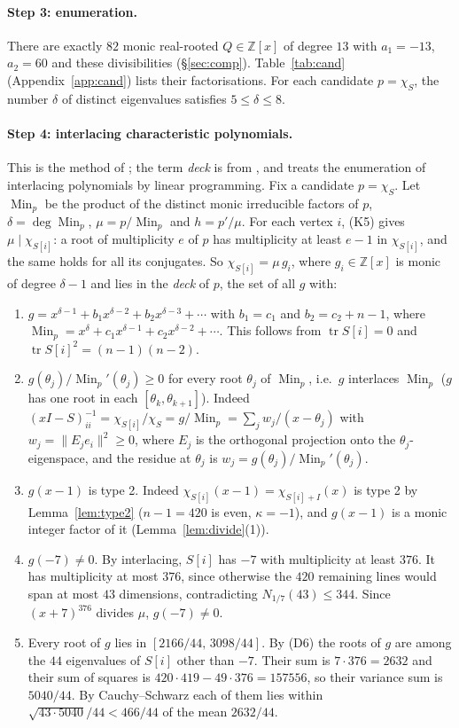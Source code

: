 \documentclass[11pt]{article}
\theoremstyle{definition}
\newcommand{\Z}{\mathbb{Z}}
\newcommand{\tr}{\operatorname{tr}}
\newcommand{\Min}{\operatorname{Min}}
\begin{document}
\paragraph{Step 3: enumeration.} There are exactly $82$ monic real-rooted $Q\in\Z[x]$ of degree $13$
with $a_1=-13$, $a_2=60$ and these divisibilities (\S\ref{sec:comp}). Table~\ref{tab:cand}
(Appendix~\ref{app:cand}) lists their factorisations. For each candidate $p=\chi_S$, the number
$\delta$ of distinct eigenvalues satisfies $5\le\delta\le8$.

\paragraph{Step 4: interlacing characteristic polynomials.} This is the method of
\cite[\S5]{GSY23}; the term \emph{deck} is from \cite[Def.~2.5]{GS24}, and \cite{GS25} treats the
enumeration of interlacing polynomials by linear programming. Fix a candidate $p=\chi_S$. Let $\Min_p$ be the product of the distinct monic
irreducible factors of $p$, $\delta=\deg\Min_p$, $\mu=p/\Min_p$ and $h=p'/\mu$. For each vertex $i$,
(K5) gives $\mu\mid\chi_{S[i]}$: a root of multiplicity $e$ of $p$ has multiplicity at least $e-1$ in
$\chi_{S[i]}$, and the same holds for all its conjugates. So $\chi_{S[i]}=\mu\,g_i$, where $g_i\in\Z[x]$ is
monic of degree $\delta-1$ and lies in the \emph{deck} of $p$, the set of all $g$ with:
\begin{enumerate}
\item[(D1)] $g=x^{\delta-1}+b_1x^{\delta-2}+b_2x^{\delta-3}+\cdots$ with $b_1=c_1$ and $b_2=c_2+n-1$, where
$\Min_p=x^\delta+c_1x^{\delta-1}+c_2x^{\delta-2}+\cdots$. This follows from $\tr S[i]=0$ and
$\tr S[i]^2=(n-1)(n-2)$.
\item[(D2)] $g(\theta_j)/\Min_p'(\theta_j)\ge0$ for every root $\theta_j$ of $\Min_p$, i.e.\ $g$
interlaces $\Min_p$ ($g$ has one root in each $[\theta_k,\theta_{k+1}]$). Indeed
$(xI-S)^{-1}_{ii}=\chi_{S[i]}/\chi_S=g/\Min_p=\sum_jw_j/(x-\theta_j)$ with
$w_j=\|E_je_i\|^2\ge0$, where $E_j$ is the orthogonal projection onto the $\theta_j$-eigenspace, and
the residue at $\theta_j$ is $w_j=g(\theta_j)/\Min_p'(\theta_j)$.
\item[(D3)] $g(x-1)$ is type 2. Indeed $\chi_{S[i]}(x-1)=\chi_{S[i]+I}(x)$ is type 2 by
Lemma~\ref{lem:type2} ($n-1=420$ is even, $\kappa=-1$), and $g(x-1)$ is a monic integer factor of it
(Lemma~\ref{lem:divide}(1)).
\item[(D6)] $g(-7)\ne0$. By interlacing, $S[i]$ has $-7$ with multiplicity at least $376$. It has
multiplicity at most $376$, since otherwise the $420$ remaining lines would span at most $43$
dimensions, contradicting $N_{1/7}(43)\le344$. Since $(x+7)^{376}$ divides $\mu$, $g(-7)\ne0$.
\item[(D7)] Every root of $g$ lies in $[2166/44,\,3098/44]$. By (D6) the roots of $g$ are among the
$44$ eigenvalues of $S[i]$ other than $-7$. Their sum is $7\cdot376=2632$ and their sum of squares is
$420\cdot419-49\cdot376=157556$, so their variance sum is $5040/44$. By Cauchy--Schwarz each of
them lies within $\sqrt{43\cdot5040}/44<466/44$ of the mean $2632/44$.
\end{enumerate}
\end{document}
